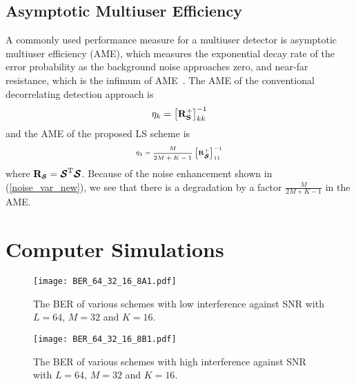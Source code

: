 \documentclass[conference]{IEEEtran}
\newcommand{\bS}{{\bf S}}
\newcommand{\bR}{{\bf R}}
\newcommand{\bcS}{{\mbox {\boldmath ${\cal S}$}}}
\begin{document}
\subsection{Asymptotic Multiuser Efficiency}

A commonly used performance measure for a multiuser detector is
asymptotic multiuser efficiency (AME), which measures the
exponential decay rate of the error probability as the background
noise approaches zero, and near-far resistance, which is the
infimum of AME~\cite{Verd98}. The AME of the conventional
decorrelating detection approach is
\begin{equation}
{\eta}_k = \left[\bR_{\bS}^{+}\right]_{kk}^{-1}
\end{equation}
and the AME of the proposed LS scheme is
\begin{equation}
{{\bar{\eta}}_1} = \frac{M}{2M+K-1}\left[\bR_{\tiny\bcS}^{+}\right]_{11}^{-1}
\end{equation}
where $\bR_{\tiny\bcS}=\bcS^{\rm T}\bcS$.  Because of the noise enhancement shown in
(\ref{noise_var_new}), we see that there is a degradation by a factor
${\frac{M}{2M+K-1}}$ in the  AME.

\section{Computer Simulations}

\begin{figure}
\centerline{\texttt{[image: BER\_64\_32\_16\_8A1.pdf]}}
\caption{ The BER of various schemes with low interference against
SNR with $L=64$, $M=32$ and $K=16$.}
\label{BER1}
\end{figure}

\begin{figure}
\centerline{\texttt{[image: BER\_64\_32\_16\_8B1.pdf]}}
\caption{ The BER of various schemes with high interference
against SNR with $L=64$, $M=32$ and $K=16$.}
\label{BER2}
\end{figure}
\end{document}

